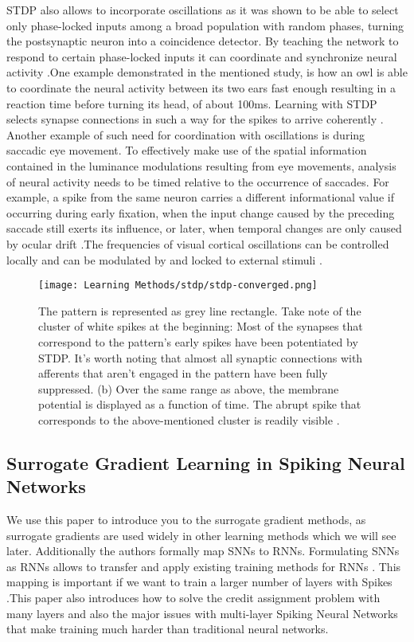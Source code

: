 \documentclass[12pt]{report}
\begin{document}
STDP also allows to incorporate oscillations as it was shown to be able to select only phase-locked inputs among a broad population with random phases, turning the postsynaptic neuron into a coincidence detector. By teaching the network to respond to certain phase-locked inputs it can coordinate and synchronize neural activity \cite{Gerstner1996}.One example demonstrated in the mentioned study, is how an owl is able to coordinate the neural activity between its two ears fast enough resulting in a reaction time before turning its head, of about 100ms. Learning with STDP selects synapse connections in such a way for the spikes to arrive coherently . Another example of such need for coordination with oscillations is during saccadic eye movement.  To effectively make use of the spatial information contained in the luminance modulations resulting from eye movements, analysis of neural activity needs to be timed relative to the occurrence of saccades. For example, a spike from the same neuron carries a different informational value if occurring during early fixation, when the input change caused by the preceding saccade still exerts its influence, or later, when temporal changes are only caused by ocular drift \cite{Rucci2018}.The frequencies of visual cortical oscillations can be controlled locally  and  can  be  modulated  by  and locked to external stimuli \cite{Ahissar2012}.


\begin{figure}[htp]
    \centering
    \texttt{[image: Learning Methods/stdp/stdp-converged.png]}
    \caption{The pattern is represented as grey line rectangle. Take note of the cluster of white spikes at the beginning: Most of the synapses that correspond to the pattern's early spikes have been potentiated by STDP. It's worth noting that almost all synaptic connections with afferents that aren't engaged in the pattern have been fully suppressed. (b) Over the same range as above, the membrane potential is displayed as a function of time. The abrupt spike that corresponds to the above-mentioned cluster is readily visible \cite{Masquelier2008}. 
    \label{fig:stdp-converged}}
\end{figure}


\subsection{Surrogate Gradient Learning in Spiking Neural Networks}
We use this paper to introduce you to the surrogate gradient methods, as surrogate gradients are used widely in other learning methods which we will see later. Additionally the authors formally map SNNs to RNNs. Formulating SNNs as RNNs allows to transfer and apply existing training methods for RNNs . This mapping is important if we want to train a larger number of layers with Spikes .This paper also introduces how to solve the credit assignment problem with many layers and also the major issues with multi-layer Spiking Neural Networks that make training much harder than traditional neural networks.
\end{document}
